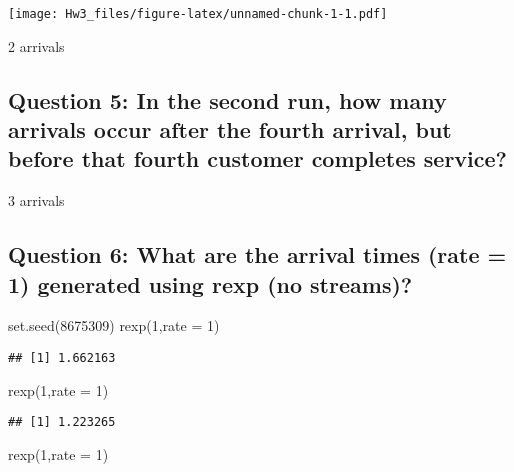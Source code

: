 \documentclass[
]{article}
\newenvironment{Shaded}{\begin{snugshade}}{\end{snugshade}}
\newcommand{\AttributeTok}[1]{\textcolor[rgb]{0.77,0.63,0.00}{#1}}
\newcommand{\DecValTok}[1]{\textcolor[rgb]{0.00,0.00,0.81}{#1}}
\newcommand{\FunctionTok}[1]{\textcolor[rgb]{0.00,0.00,0.00}{#1}}
\newcommand{\NormalTok}[1]{#1}
\begin{document}
\texttt{[image: Hw3\_files/figure-latex/unnamed-chunk-1-1.pdf]}

2 arrivals

\hypertarget{question-5-in-the-second-run-how-many-arrivals-occur-after-the-fourth-arrival-but-before-that-fourth-customer-completes-service}{%
\subsection{Question 5: In the second run, how many arrivals occur after
the fourth arrival, but before that fourth customer completes
service?}\label{question-5-in-the-second-run-how-many-arrivals-occur-after-the-fourth-arrival-but-before-that-fourth-customer-completes-service}}

3 arrivals

\hypertarget{question-6-what-are-the-arrival-times-rate-1-generated-using-rexp-no-streams}{%
\subsection{Question 6: What are the arrival times (rate = 1) generated
using rexp (no
streams)?}\label{question-6-what-are-the-arrival-times-rate-1-generated-using-rexp-no-streams}}

\begin{Shaded}
\begin{Highlighting}[]
\FunctionTok{set.seed}\NormalTok{(}\DecValTok{8675309}\NormalTok{)}
\FunctionTok{rexp}\NormalTok{(}\DecValTok{1}\NormalTok{,}\AttributeTok{rate =} \DecValTok{1}\NormalTok{)}
\end{Highlighting}
\end{Shaded}

\begin{verbatim}
## [1] 1.662163
\end{verbatim}

\begin{Shaded}
\begin{Highlighting}[]
\FunctionTok{rexp}\NormalTok{(}\DecValTok{1}\NormalTok{,}\AttributeTok{rate =} \DecValTok{1}\NormalTok{)}
\end{Highlighting}
\end{Shaded}

\begin{verbatim}
## [1] 1.223265
\end{verbatim}

\begin{Shaded}
\begin{Highlighting}[]
\FunctionTok{rexp}\NormalTok{(}\DecValTok{1}\NormalTok{,}\AttributeTok{rate =} \DecValTok{1}\NormalTok{)}
\end{Highlighting}
\end{Shaded}
\end{document}

